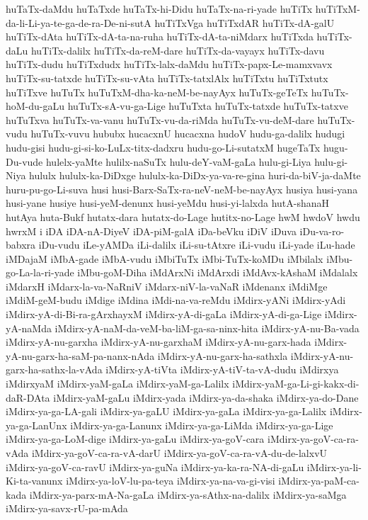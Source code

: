 {huTaTx-daMdu
huTaTxde
huTaTx-hi-Didu
huTaTx-na-ri-yade
huTiTx
huTiTxM-da-li-Li-ya-te-ga-de-ra-De-ni-sutA
huTiTxVga
huTiTxdAR
huTiTx-dA-galU
huTiTx-dAta
huTiTx-dA-ta-na-ruha
huTiTx-dA-ta-niMdarx
huTiTxda
huTiTx-daLu
huTiTx-dalilx
huTiTx-da-reM-dare
huTiTx-da-vayayx
huTiTx-davu
huTiTx-dudu
huTiTxdudx
huTiTx-lalx-daMdu
huTiTx-papx-Le-mamxvavx
huTiTx-su-tatxde
huTiTx-su-vAta
huTiTx-tatxlAlx
huTiTxtu
huTiTxtutx
huTiTxve
huTuTx
huTuTxM-dha-ka-neM-be-nayAyx
huTuTx-geTeTx
huTuTx-hoM-du-gaLu
huTuTx-sA-vu-ga-Lige
huTuTxta
huTuTx-tatxde
huTuTx-tatxve
huTuTxva
huTuTx-va-vanu
huTuTx-vu-da-riMda
huTuTx-vu-deM-dare
huTuTx-vudu
huTuTx-vuvu
hububx
hucacxnU
hucacxna
hudoV
hudu-ga-dalilx
hudugi
hudu-gisi
hudu-gi-si-ko-LuLx-titx-dadxru
hudu-go-Li-sutatxM
hugeTaTx
hugu-Du-vude
hulelx-yaMte
hulilx-naSuTx
hulu-deY-vaM-gaLa
hulu-gi-Liya
hulu-gi-Niya
hululx
hululx-ka-DiDxge
hululx-ka-DiDx-ya-va-re-gina
huri-da-biV-ja-daMte
huru-pu-go-Li-suva
husi
husi-Barx-SaTx-ra-neV-neM-be-nayAyx
husiya
husi-yana
husi-yane
husiye
husi-yeM-denunx
husi-yeMdu
husi-yi-lalxda
hutA-shanaH
hutAya
huta-Bukf
hutatx-dara
hutatx-do-Lage
hutitx-no-Lage
hwM
hwdoV
hwdu
hwrxM
i
iDA
iDA-nA-DiyeV
iDA-piM-galA
iDa-beVku
iDiV
iDuva
iDu-va-ro-babxra
iDu-vudu
iLe-yAMDa
iLi-dalilx
iLi-su-tAtxre
iLi-vudu
iLi-yade
iLu-hade
iMDajaM
iMbA-gade
iMbA-vudu
iMbiTuTx
iMbi-TuTx-koMDu
iMbilalx
iMbu-go-La-la-ri-yade
iMbu-goM-Diha
iMdArxNi
iMdArxdi
iMdAvx-kAshaM
iMdalalx
iMdarxH
iMdarx-la-va-NaRniV
iMdarx-niV-la-vaNaR
iMdenanx
iMdiMge
iMdiM-geM-budu
iMdige
iMdina
iMdi-na-va-reMdu
iMdirx-yANi
iMdirx-yAdi
iMdirx-yA-di-Bi-ra-gArxhayxM
iMdirx-yA-di-gaLa
iMdirx-yA-di-ga-Lige
iMdirx-yA-naMda
iMdirx-yA-naM-da-veM-ba-liM-ga-sa-ninx-hita
iMdirx-yA-nu-Ba-vada
iMdirx-yA-nu-garxha
iMdirx-yA-nu-garxhaM
iMdirx-yA-nu-garx-hada
iMdirx-yA-nu-garx-ha-saM-pa-nanx-nAda
iMdirx-yA-nu-garx-ha-sathxla
iMdirx-yA-nu-garx-ha-sathx-la-vAda
iMdirx-yA-tiVta
iMdirx-yA-tiV-ta-vA-dudu
iMdirxya
iMdirxyaM
iMdirx-yaM-gaLa
iMdirx-yaM-ga-Lalilx
iMdirx-yaM-ga-Li-gi-kakx-di-daR-DAta
iMdirx-yaM-gaLu
iMdirx-yada
iMdirx-ya-da-shaka
iMdirx-ya-do-Dane
iMdirx-ya-ga-LA-gali
iMdirx-ya-gaLU
iMdirx-ya-gaLa
iMdirx-ya-ga-Lalilx
iMdirx-ya-ga-LanUnx
iMdirx-ya-ga-Lanunx
iMdirx-ya-ga-LiMda
iMdirx-ya-ga-Lige
iMdirx-ya-ga-LoM-dige
iMdirx-ya-gaLu
iMdirx-ya-goV-cara
iMdirx-ya-goV-ca-ra-vAda
iMdirx-ya-goV-ca-ra-vA-darU
iMdirx-ya-goV-ca-ra-vA-du-de-lalxvU
iMdirx-ya-goV-ca-ravU
iMdirx-ya-guNa
iMdirx-ya-ka-ra-NA-di-gaLu
iMdirx-ya-li-Ki-ta-vanunx
iMdirx-ya-loV-lu-pa-teya
iMdirx-ya-na-va-gi-visi
iMdirx-ya-paM-ca-kada
iMdirx-ya-parx-mA-Na-gaLa
iMdirx-ya-sAthx-na-dalilx
iMdirx-ya-saMga
iMdirx-ya-savx-rU-pa-mAda
}
